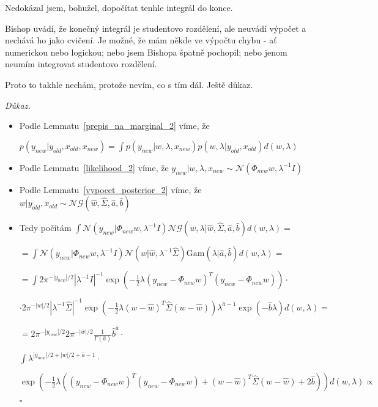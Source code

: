 \documentclass{article}
\newenvironment{pitemize}{
\begin{itemize}
  \setlength{\itemsep}{5pt}
  \setlength{\parskip}{0pt}
  \setlength{\parsep}{0pt}
}{\end{itemize}}
\newenvironment{pproof}{
\noindent\emph{Důkaz.}
\begin{pitemize}
}{\hfill$\square$\end{pitemize}}
\newcommand{\NN}{\mathcal{N}}
\newcommand{\NoG}{\mathcal{NG}}
\newcommand{\Gam}{\mathrm{Gam}}
\theoremstyle{definition}
\begin{document}
Nedokázal jsem, bohužel, dopočítat tenhle integrál do konce.

Bishop uvádí, že konečný integrál je studentovo rozdělení, ale neuvádí výpočet a nechává ho jako cvičení. Je možné, že mám někde ve výpočtu chybu - ať numerickou nebo logickou; nebo jsem Bishopa špatně pochopil; nebo jenom neumím integrovat studentovo rozdělení.

Proto to takhle nechám, protože nevím, co s tím dál. Ještě důkaz.

\begin{pproof}
\item Podle Lemmatu~\ref{prepis_na_marginal_2} víme, že 

$p(y_{new}|y_{old},x_{old},x_{new})=\int p(y_{new}|w,\lambda,x_{new})p(w, \lambda|y_{old},x_{old})d(w,\lambda)$
\item Podle Lemmatu~\ref{likelihood_2} víme, že $y_{new}|w,\lambda,x_{new}\sim\NN(\Phi_{new}w,\lambda^{-1}I)$
\item Podle Lemmatu~\ref{vypocet_posterior_2} víme, že $w|y_{old},x_{old} \sim \NoG(\hat{w},\hat{\Sigma},\hat{a},\hat{b})$
\item Tedy počítám $\int \NN\left(y_{new}|\Phi_{new}w,\lambda^{-1}I\right) \NoG\left(w,\lambda|\hat{w},\hat{\Sigma},\hat{a},\hat{b}\right) d\left(w,\lambda\right)=$




 $=\int \NN\left(y_{new}|\Phi_{new}w,\lambda^{-1}I\right) \NN\left(w|\hat{w},\lambda^{-1}\hat{\Sigma}\right) \Gam\left(\lambda|\hat{a},\hat{b}\right) d\left(w,\lambda\right)=$

$= \int 2\pi^{-\left|y_{new}\right|/2}\left|\lambda^{-1}I\right|^{-1}
\exp\left(-\frac{1}{2}\lambda\left(y_{new}-\Phi_{new}w\right)^T
\left(y_{new}-\Phi_{new}w\right)\right)\cdot$

\nopagebreak

$\cdot 2\pi^{-\left|w\right|/2} \left|\lambda^{-1}\hat{\Sigma}\right|^{-1}
\exp\left(-\frac{1}{2}\lambda(w-\hat{w})^T\hat{\Sigma}
\left(w-\hat{w}\right)\right) \lambda^{\hat a-1}\exp\left (-\hat b \lambda\right ) d \left(w,\lambda\right)=$


$= 2\pi^{-\left|y_{new}\right|/2}  2\pi^{-\left|w\right|/2}  \frac{1}{\Gamma(\hat a)}  \hat b^{\hat a} \cdot$
\nopagebreak

$\int \lambda^{\left|y_{new}\right|/2+\left|w\right|/2+\hat{a}-1}\cdot$
\nopagebreak

$\exp\left(-\frac{1}{2}\lambda\left(\left(y_{new}-\Phi_{new}w\right)^T
\left(y_{new}-\Phi_{new}w\right)
+\left(w-\hat{w}\right)^T\hat{\Sigma}
\left(w-\hat{w}\right)+2\hat{b}
\right)\right)d(w,\lambda) \propto$


\end{pproof}
\end{document}
